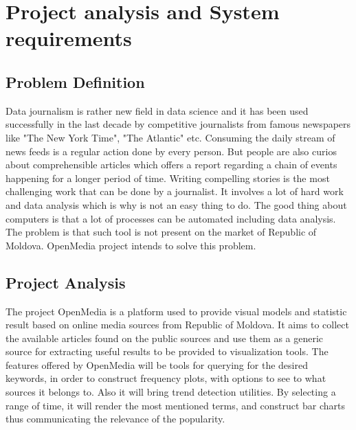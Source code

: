 \section{Project analysis and System requirements}

\subsection{Problem Definition}
Data journalism is rather new field in data science and it has been used  successfully in the last decade by competitive journalists from famous newspapers like "The New York Time", "The Atlantic" etc. Consuming the daily stream of news feeds is a regular action done by every person. But people are also curios about comprehensible articles which offers a report regarding a chain of events happening for a longer period of time. Writing compelling stories is the most challenging work that can be done by a journalist. It involves a lot of hard work and data analysis which is why is not an easy thing to do. The good thing about computers is that a lot of processes can be automated including data analysis. The problem is that such tool is not present on the market of Republic of Moldova. OpenMedia project intends to solve this problem.

\subsection{Project Analysis}
The project OpenMedia is a platform used to provide visual models and statistic result based on online media sources from Republic of Moldova. It aims to collect the available articles found on the public sources and use them as a generic source for extracting useful results to be provided to visualization tools. The features offered by OpenMedia will be tools for querying for the desired keywords, in order to construct frequency plots, with options to see to what sources it belongs to. Also it will bring trend detection utilities. By selecting a range of time, it will render the most mentioned terms, and construct bar charts thus communicating the relevance of the popularity.

